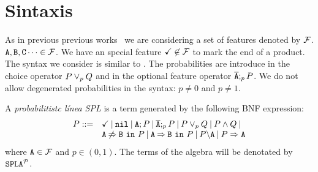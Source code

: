 \section{Sintaxis}
\label{sec:stat:sintax}
As in previous previous works~\cite{acl13,cln16} we are considering a
set of features denoted by $\calF$.  $\feature{A}, \feature{B},
\feature{C}\dots\in\calF$. We have an special feature
$\checkmark\not\in\calF$ to mark the end  of a product. The syntax we consider is similar to 
\fodaPA. The probabilities are introduce in the choice operator $P \choice_{p} Q $ and in
the optional feature operator $\ofeature{A};_{p} P$. We do not allow
degenerated probabilities in the syntax: $p\neq 0$ and $p\neq 1$.

\bdfn
\label{sec:stat:sintax:dfn}
A \emph{probabilitistc línea SPL} is a term generated by the following
BNF expression:
$$
\begin{array}{ll}
P::=& \checkmark \barra \nil \barra \feature{A};P \barra
\ofeature{A};_{p} P \barra P \choice_{p} Q \barra P \paral Q \barra
\\ 
& \exclude{A}{B}{P}\barra  \require{A}{B}{P}\barra  \forbid{A}{P}\barra  \mandatory{A}{P}\\ 
\end{array}     
$$
\noindent 
where $\feature{A} \in \calF$ and $p\in(0,1)$. The terms of the
algebra
will be denotated by  $\fodaPAp$.
\edfn





